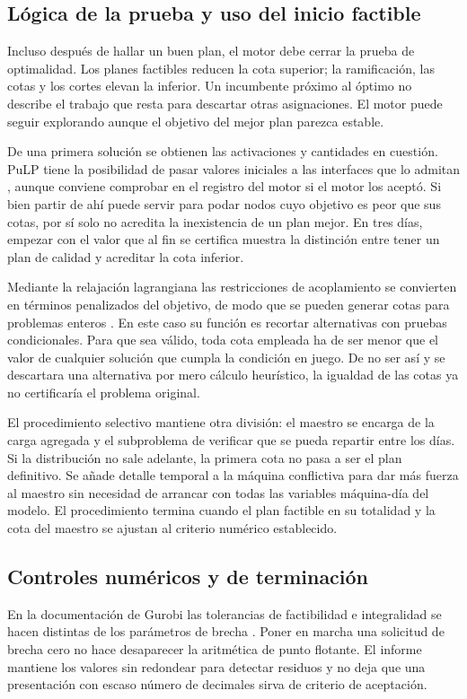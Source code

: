 \subsection{Lógica de la prueba y uso del inicio factible}
Incluso después de hallar un buen plan, el motor debe cerrar la prueba de optimalidad. Los planes factibles reducen la cota superior; la ramificación, las cotas y los cortes elevan la inferior. Un incumbente próximo al óptimo no describe el trabajo que resta para descartar otras asignaciones. El motor puede seguir explorando aunque el objetivo del mejor plan parezca estable.

De una primera solución se obtienen las activaciones y cantidades en cuestión. PuLP tiene la posibilidad de pasar valores iniciales a las interfaces que lo admitan \cite{pulpstart}, aunque conviene comprobar en el registro del motor si el motor los aceptó. Si bien partir de ahí puede servir para podar nodos cuyo objetivo es peor que sus cotas, por sí solo no acredita la inexistencia de un plan mejor. En tres días, empezar con el valor que al fin se certifica muestra la distinción entre tener un plan de calidad y acreditar la cota inferior.

Mediante la relajación lagrangiana las restricciones de acoplamiento se convierten en términos penalizados del objetivo, de modo que se pueden generar cotas para problemas enteros \cite{fisher}. En este caso su función es recortar alternativas con pruebas condicionales. Para que sea válido, toda cota empleada ha de ser menor que el valor de cualquier solución que cumpla la condición en juego. De no ser así y se descartara una alternativa por mero cálculo heurístico, la igualdad de las cotas ya no certificaría el problema original.

El procedimiento selectivo mantiene otra división: el maestro se encarga de la carga agregada y el subproblema de verificar que se pueda repartir entre los días. Si la distribución no sale adelante, la primera cota no pasa a ser el plan definitivo. Se añade detalle temporal a la máquina conflictiva para dar más fuerza al maestro sin necesidad de arrancar con todas las variables máquina-día del modelo. El procedimiento termina cuando el plan factible en su totalidad y la cota del maestro se ajustan al criterio numérico establecido.

\subsection{Controles numéricos y de terminación}
En la documentación de Gurobi las tolerancias de factibilidad e integralidad se hacen distintas de los parámetros de brecha \cite{numeric}. Poner en marcha una solicitud de brecha cero no hace desaparecer la aritmética de punto flotante. El informe mantiene los valores sin redondear para detectar residuos y no deja que una presentación con escaso número de decimales sirva de criterio de aceptación.

